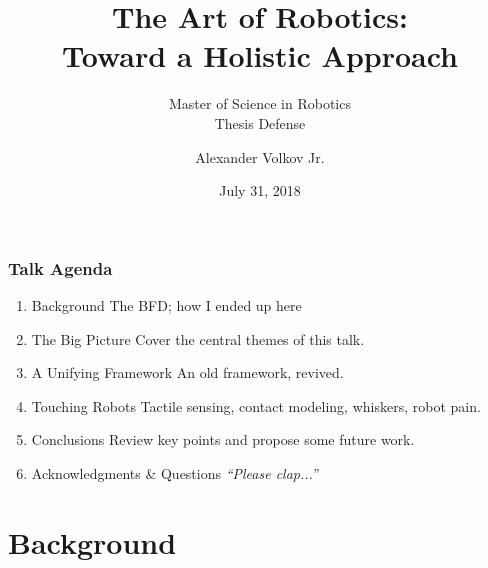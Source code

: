 \documentclass[aspectratio=169]{beamer}
\title{The Art of Robotics:\\\vspace{0.2em}\huge{Toward a Holistic Approach}}
\subtitle{Master of Science in Robotics\\Thesis Defense}
\author{Alexander Volkov Jr.}
\date{July 31, 2018}
\begin{document}
	\setcounter{showProgressBar}{0}
	\setcounter{showSlideNumbers}{0}

	\frame{\titlepage}

	\begin{frame}
		\frametitle{Talk Agenda}
		\begin{enumerate}
			\setlength{\itemsep}{4mm}
			\item Background
				\textcolor{AVThesisGrey}{\footnotesize\hspace{1em} The BFD; how I ended up here}
				
			
			\item The Big Picture
				\textcolor{AVThesisGrey}{\footnotesize\hspace{1em} Cover the central themes of this talk.}
			
			\item A Unifying Framework
				\textcolor{AVThesisGrey}{\footnotesize\hspace{1em} An old framework, revived.}
			
	
			\item Touching Robots
				\textcolor{AVThesisGrey}{\footnotesize\hspace{1em} Tactile sensing, contact modeling, whiskers, robot pain.}
			
			\item Conclusions
				\textcolor{AVThesisGrey}{\footnotesize\hspace{1em} Review key points and propose some future work.}
			
			\item Acknowledgments \& Questions
				\textcolor{AVThesisGrey}{\footnotesize\hspace{1em} \emph{``Please clap...''}}
		\end{enumerate}
	\end{frame}

	\setcounter{framenumber}{0}
	\setcounter{showProgressBar}{1}
	\setcounter{showSlideNumbers}{1}
	
	\section{Background}
		
\end{document}
